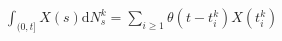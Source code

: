 \documentclass{article}
\newcommand{\mathd}{\mathrm{d}}
\begin{document}
$\int_{( 0, t]} X ( s) \mathd N^k_s = \sum_{i \geqslant 1} \theta ( t - t_i^k)
X ( t_i^k)$
\end{document}
